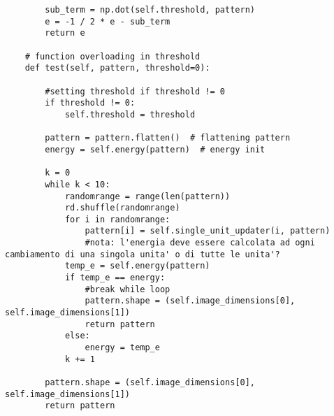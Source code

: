 \documentclass[letterpaper,twocolumn,10pt]{article}
\begin{document}
\begin{lstlisting}
        sub_term = np.dot(self.threshold, pattern)
        e = -1 / 2 * e - sub_term
        return e

    # function overloading in threshold
    def test(self, pattern, threshold=0):

        #setting threshold if threshold != 0
        if threshold != 0:
            self.threshold = threshold

        pattern = pattern.flatten()  # flattening pattern
        energy = self.energy(pattern)  # energy init

        k = 0
        while k < 10:
            randomrange = range(len(pattern))
            rd.shuffle(randomrange)
            for i in randomrange:
                pattern[i] = self.single_unit_updater(i, pattern)
                #nota: l'energia deve essere calcolata ad ogni cambiamento di una singola unita' o di tutte le unita'?
            temp_e = self.energy(pattern)
            if temp_e == energy:
                #break while loop
                pattern.shape = (self.image_dimensions[0], self.image_dimensions[1])
                return pattern
            else:
                energy = temp_e
            k += 1

        pattern.shape = (self.image_dimensions[0], self.image_dimensions[1])
        return pattern
\end{lstlisting}

\clearpage
\end{document}
